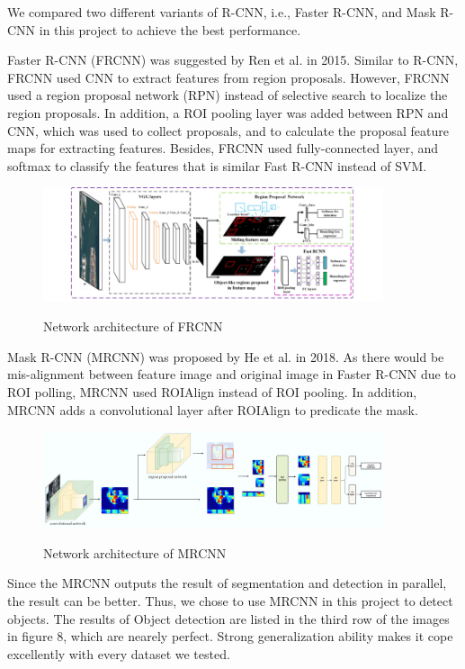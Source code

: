 \documentclass[runningheads]{llncs}
\begin{document}
We compared two different variants of R-CNN, i.e., Faster 
R-CNN, and Mask R-CNN in this project to achieve the best 
performance. 

Faster R-CNN\cite{FasterRCNN} (FRCNN) was suggested by Ren 
et al. in 2015. Similar to R-CNN, FRCNN used CNN to extract 
features from region proposals. However, FRCNN used a 
region proposal network (RPN) instead of selective search 
to localize the region proposals. In addition, a ROI 
pooling layer was added between RPN and CNN, which was used 
to collect proposals, and to calculate the proposal feature 
maps for extracting features. Besides, FRCNN used 
fully-connected layer, and softmax to classify the features 
that is similar Fast R-CNN instead of SVM. 

\begin{figure}
    \centering
    \includegraphics[width=10cm]{reference/frcnn}
    \label{fig:FRCNN}
    \caption{Network architecture of FRCNN\cite{FasterRCNN}}
\end{figure}

Mask R-CNN\cite{MaskRCNN} (MRCNN) was proposed by He et al. 
in 2018. As there would be mis-alignment between feature 
image and original image in Faster R-CNN due to ROI polling, 
MRCNN used ROIAlign instead of ROI pooling. In addition, 
MRCNN adds a convolutional layer after ROIAlign to predicate 
the mask. 

\begin{figure}
    \centering
    \includegraphics[width=10cm]{reference/mrcnn}
    \label{fig:MRCNN}
    \caption{Network architecture of MRCNN\cite{MaskRCNN}}
\end{figure}

Since the MRCNN outputs the result of segmentation and 
detection in parallel, the result can be better. Thus, 
we chose to use MRCNN in this project to detect objects.
The results of Object detection are listed in the third row 
of the images in figure 8, which are nearely perfect. 
Strong generalization ability makes it cope excellently 
with every dataset we tested. 
\end{document}
